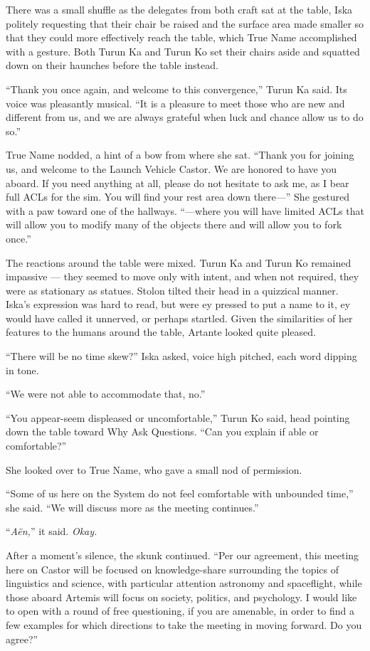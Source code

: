 There was a small shuffle as the delegates from both craft sat at the table, Iska politely requesting that their chair be raised and the surface area made smaller so that they could more effectively reach the table, which True Name accomplished with a gesture. Both Turun Ka and Turun Ko set their chairs aside and squatted down on their haunches before the table instead.

``Thank you once again, and welcome to this convergence,'' Turun Ka said. Its voice was pleasantly musical. ``It is a pleasure to meet those who are new and different from us, and we are always grateful when luck and chance allow us to do so.''

True Name nodded, a hint of a bow from where she sat. ``Thank you for joining us, and welcome to the Launch Vehicle Castor. We are honored to have you aboard. If you need anything at all, please do not hesitate to ask me, as I bear full ACLs for the sim. You will find your rest area down there—'' She gestured with a paw toward one of the hallways. ``—where you will have limited ACLs that will allow you to modify many of the objects there and will allow you to fork once.''

The reactions around the table were mixed. Turun Ka and Turun Ko remained impassive — they seemed to move only with intent, and when not required, they were as stationary as statues. Stolon tilted their head in a quizzical manner. Iska's expression was hard to read, but were ey pressed to put a name to it, ey would have called it unnerved, or perhaps startled. Given the similarities of her features to the humans around the table, Artante looked quite pleased.

``There will be no time skew?'' Iska asked, voice high pitched, each word dipping in tone.

``We were not able to accommodate that, no.''

``You appear-seem displeased or uncomfortable,'' Turun Ko said, head pointing down the table toward Why Ask Questions. ``Can you explain if able or comfortable?''

She looked over to True Name, who gave a small nod of permission.

``Some of us here on the System do not feel comfortable with unbounded time,'' she said. ``We will discuss more as the meeting continues.''

``\emph{Aën,}'' it said. \emph{Okay.}

After a moment's silence, the skunk continued. ``Per our agreement, this meeting here on Castor will be focused on knowledge-share surrounding the topics of linguistics and science, with particular attention astronomy and spaceflight, while those aboard Artemis will focus on society, politics, and psychology. I would like to open with a round of free questioning, if you are amenable, in order to find a few examples for which directions to take the meeting in moving forward. Do you agree?''

